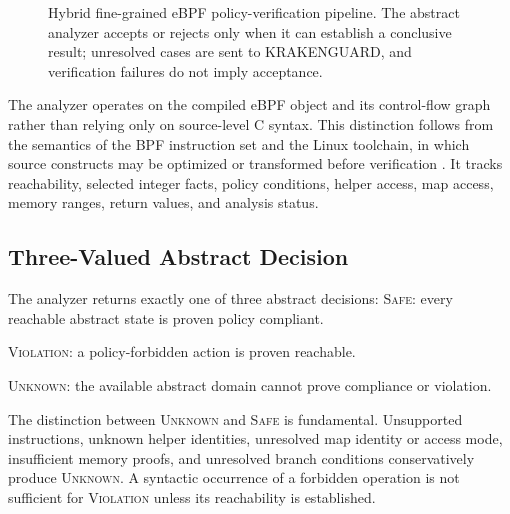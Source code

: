 \documentclass[12pt,a4paper]{article}
\begin{document}
\begin{figure}[t]
\caption{Hybrid fine-grained eBPF policy-verification pipeline. The abstract analyzer accepts or rejects only when it can establish a conclusive result; unresolved cases are sent to KRAKENGUARD, and verification failures do not imply acceptance.}
\label{fig:architecture}
\end{figure}

The analyzer operates on the compiled eBPF object and its control-flow graph rather than relying only on source-level C syntax. This distinction follows from the semantics of the BPF instruction set and the Linux toolchain, in which source constructs may be optimized or transformed before verification \citep{linuxbpfdocs,thaler2024bpfisa}. It tracks reachability, selected integer facts, policy conditions, helper access, map access, memory ranges, return values, and analysis status.

\subsection{Three-Valued Abstract Decision}

The analyzer returns exactly one of three abstract decisions:
\noindent \textsc{Safe}: every reachable abstract state is proven policy compliant.

\noindent \textsc{Violation}: a policy-forbidden action is proven reachable.

\noindent \textsc{Unknown}: the available abstract domain cannot prove compliance or violation.

The distinction between \textsc{Unknown} and \textsc{Safe} is fundamental. Unsupported instructions, unknown helper identities, unresolved map identity or access mode, insufficient memory proofs, and unresolved branch conditions conservatively produce \textsc{Unknown}. A syntactic occurrence of a forbidden operation is not sufficient for \textsc{Violation} unless its reachability is established.
\end{document}
